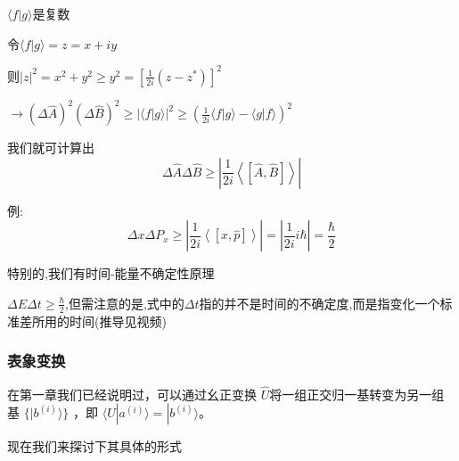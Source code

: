 \documentclass[lang=cn,15pt]{elegantbook}
\begin{document}
$\langle f|g\rangle$是复数

令$\langle f|g\rangle=z=x+iy$

则$|z|^2=x^2+y^2\ge y^2=[\frac{1}{2i}(z-z^*)]^2 $

$\rightarrow\left( \varDelta \hat{A} \right) ^2\left( \varDelta \hat{B} \right) ^2\ge |\langle f|g\rangle |^2\ge \left( \frac{1}{2i}\langle f|g\rangle -\langle g|f\rangle \right) ^2$

我们就可计算出
\begin{equation*}
	\varDelta \hat{A}\varDelta \hat{B}\ge |\frac{1}{2i}\left< \left[ \hat{A},\hat{B} \right] \right> |
\end{equation*}

例:
\begin{equation*}
	\varDelta x\varDelta P_x\ge |\frac{1}{2i}\left< \left[ x,\hat{p} \right] \right> |=|\frac{1}{2i}i\hbar |=\frac{\hbar}{2}
\end{equation*}

特别的,我们有时间-能量不确定性原理

$\varDelta E\varDelta t\ge \frac{\hbar}{2}$,但需注意的是,式中的$\varDelta t$指的并不是时间的不确定度,而是指变化一个标准差所用的时间(推导见视频)
\subsubsection{表象变换}
在第一章我们已经说明过，可以通过幺正变换 $\hat{U}$将一组正交归一基转变为另一组基 $\{ |b^{(i)}\rangle \}$ ，即 $\langle U  |a^{(i)}\rangle =  |b^{(i)}\rangle$。

现在我们来探讨下其具体的形式
\end{document}
